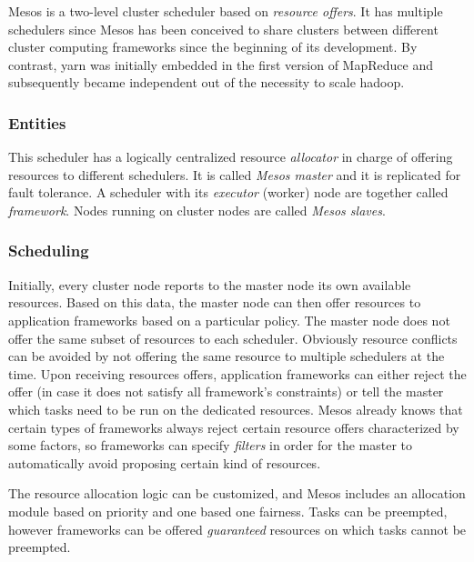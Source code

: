 
Mesos \cite{mesos} is a two-level cluster scheduler based on \textit{resource offers}.
It has multiple schedulers since Mesos \cite{mesos} has been conceived to share clusters between different cluster computing frameworks since the beginning of its development.
By contrast, \glsdesc{yarn} was initially embedded in the first version of MapReduce \cite{mapreduce} and subsequently became independent out of the necessity to scale \glsdesc{hadoop}.

\subsubsection{Entities}
This scheduler has a logically centralized resource \textit{allocator} in charge of offering resources to different schedulers.
It is called \textit{Mesos master} and it is replicated for fault tolerance.
A scheduler with its \textit{executor} (worker) node are together called \textit{framework}.
Nodes running on cluster nodes are called \textit{Mesos slaves}.

\subsubsection{Scheduling}
Initially, every cluster node reports to the master node its own available resources.
Based on this data, the master node can then offer resources to application frameworks based on a particular policy.
The master node does not offer the same subset of resources to each scheduler.
Obviously resource conflicts can be avoided by not offering the same resource to multiple schedulers at the time.
Upon receiving resources offers, application frameworks can either reject the offer (in case it does not satisfy all framework's constraints) or tell the master which tasks need to be run on the dedicated resources.
Mesos \cite{mesos} already knows that certain types of frameworks always reject certain resource offers characterized by some factors, so frameworks can specify \textit{filters} in order for the master to automatically avoid proposing certain kind of resources.\par
The resource allocation logic can be customized, and Mesos \cite{mesos} includes an allocation module based on priority and one based one fairness.
Tasks can be preempted, however frameworks can be offered \textit{guaranteed} resources on which tasks cannot be preempted.


